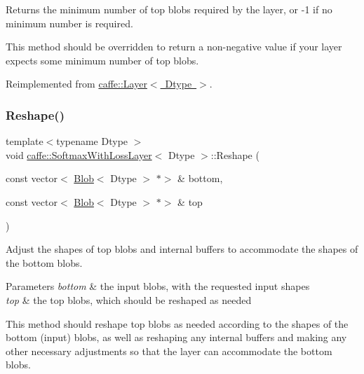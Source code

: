 Returns the minimum number of top blobs required by the layer, or -\/1 if no minimum number is required. 

This method should be overridden to return a non-\/negative value if your layer expects some minimum number of top blobs. 

Reimplemented from \mbox{\hyperlink{classcaffe_1_1_layer_ab9e4c8d642e413948b131d851a8462a4}{caffe\+::\+Layer$<$ Dtype $>$}}.

\mbox{\label{classcaffe_1_1_softmax_with_loss_layer_a2821b89b0f46a5e2ddaccb2708ab237b}} 
\subsubsection{\texorpdfstring{Reshape()}{Reshape()}\hspace{0.1cm}{\footnotesize\ttfamily [1/2]}}
{\footnotesize\ttfamily template$<$typename Dtype $>$ \\
void \mbox{\hyperlink{classcaffe_1_1_softmax_with_loss_layer}{caffe\+::\+Softmax\+With\+Loss\+Layer}}$<$ Dtype $>$\+::Reshape (\begin{DoxyParamCaption}\item[{const vector$<$ \mbox{\hyperlink{classcaffe_1_1_blob}{Blob}}$<$ Dtype $>$ $\ast$$>$ \&}]{bottom,  }\item[{const vector$<$ \mbox{\hyperlink{classcaffe_1_1_blob}{Blob}}$<$ Dtype $>$ $\ast$$>$ \&}]{top }\end{DoxyParamCaption})\hspace{0.3cm}{\ttfamily [virtual]}}



Adjust the shapes of top blobs and internal buffers to accommodate the shapes of the bottom blobs. 


\begin{DoxyParams}{Parameters}
{\em bottom} & the input blobs, with the requested input shapes \\
\hline
{\em top} & the top blobs, which should be reshaped as needed\\
\hline
\end{DoxyParams}
This method should reshape top blobs as needed according to the shapes of the bottom (input) blobs, as well as reshaping any internal buffers and making any other necessary adjustments so that the layer can accommodate the bottom blobs. 

